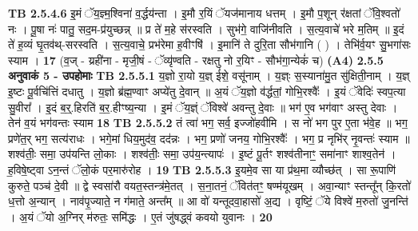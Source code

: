 \documentclass[17pt]{extarticle}
\begin{document}
                  \newline
                                \textbf{ TB 2.5.4.6} \newline
                  इ॒मं ॅय॒ज्ञ्म॒श्विना॑ व॒र्द्धय॑न्ता । इ॒मौ र॒यिं ॅयज॑मानाय धत्तम् । इ॒मौ प॒शून् र॑क्षतां ॅवि॒श्वतो॑ नः । पू॒षा नः॑ पातु॒ सद॒म-प्र॑युच्छन्न् ॥ प्र ते॑ म॒हे स॑रस्वति । सुभ॑गे॒ वाजि॑नीवति । स॒त्य॒वाचे॑ भरे म॒तिम् ॥ इ॒दं ते॑ ह॒व्यं घृ॒तव॑थ्-सरस्वति । स॒त्य॒वाचे॒ प्रभ॑रेमा ह॒वीꣳषि॑ । इ॒मानि॑ ते दुरि॒ता सौभ॑गानि ( ) । तेभि॑र्व॒यꣳ सु॒भगा॑सः स्याम । \textbf{ 17} \newline
                  \newline
                                    (व॒ज् - य्रही॑ना - मृजी॒षं - ॅव्यृ॑ण्वति - रक्षतु नो र॒यिꣳ - सौभ॑गा॒न्येकं॑ च) \textbf{(A4)} \newline \newline
                \textbf{ 2.5.5     अनुवाकं   5 -  उपहोमाः} \newline
                                \textbf{ TB 2.5.5.1} \newline
                  य॒ज्ञो रा॒यो य॒ज्ञ् ई॑शे॒ वसू॑नाम् । य॒ज्ञ्ः स॒स्याना॑मु॒त सु॑क्षिती॒नाम् । य॒ज्ञ् इ॒ष्टः पू॒र्वचि॑त्तिं दधातु । य॒ज्ञो ब्र॑ह्म॒ण्वाꣳ अप्ये॑तु दे॒वान् ॥ अ॒यं ॅय॒ज्ञो व॑र्द्धतां॒ गोभि॒रश्वैः᳚ । इ॒यं ॅवेदिः॑ स्वप॒त्या सु॒वीरा᳚ । इ॒दं ब॒र्॒.हिरति॑ ब॒र॒.हीꣳष्य॒न्या । इ॒मं ॅय॒ज्ञ्ं ॅविश्वे॑ अवन्तु दे॒वाः ॥ भग॑ ए॒व भग॑वाꣳ अस्तु देवाः । तेन॑ व॒यं भग॑वन्तः स्याम \textbf{ 18} \newline
                  \newline
                                \textbf{ TB 2.5.5.2} \newline
                  तं त्वा॑ भग॒ सर्व॒ इज्जो॑हवीमि । स नो॑ भग पुर ए॒ता भ॑वे॒ह ॥ भग॒ प्रणे॑त॒र् भग॒ सत्य॑राधः । भगे॒मां धिय॒मुद॑व॒ दद॑न्नः । भग॒ प्रणो॑ जनय॒ गोभि॒रश्वैः᳚ । भग॒ प्र नृभि॑र् नृ॒वन्तः॑ स्याम ॥ शश्व॑तीः॒ समा॒ उप॑यन्ति लो॒काः । शश्व॑तीः॒ समा॒ उप॑य॒न्त्यापः॑ । इ॒ष्टं पू॒र्तꣳ शश्व॑तीनाꣳ॒॒ समा॑नाꣳ शाश्व॒तेन॑ । ह॒विषे॒ष्ट्वा ऽन॒न्तं ॅलो॒कं पर॒मारु॑रोह । \textbf{ 19} \newline
                  \newline
                                \textbf{ TB 2.5.5.3} \newline
                  इ॒यमे॒व सा या प्र॑थ॒मा व्यौच्छ॑त् । सा रू॒पाणि॑ कुरुते॒ पञ्च॑ दे॒वी ॥ द्वे स्वसा॑रौ वयत॒स्तन्त्र॑मे॒तत् । स॒ना॒तनं॒ ॅवित॑तꣳ॒॒ षण्म॑यूखम् । अवा॒न्याꣳ स्तन्तू᳚न् कि॒रतो॑ ध॒त्तो अ॒न्यान् । नाव॑पृ॒ज्याते॒ न ग॑माते॒ अन्त᳚म् ॥ आ वो॑ यन्तूदवा॒हासो॑ अ॒द्य । वृष्टिं॒ ॅये विश्वे॑ म॒रुतो॑ जु॒नन्ति॑ । अ॒यं ॅयो अ॒ग्निर् म॑रुतः॒ समि॑द्धः । ए॒तं जु॑षद्ध्वं कवयो युवानः । \textbf{ 20} \newline
\end{document}
